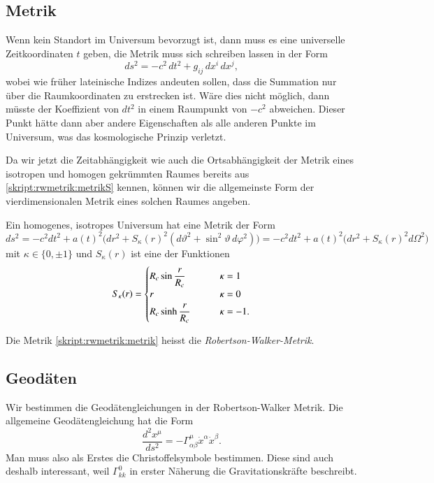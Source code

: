 
\subsection{Metrik}
Wenn kein Standort im Universum bevorzugt ist, dann muss es
eine universelle Zeitkoordinaten $t$ geben, die Metrik muss
sich schreiben lassen in der Form
\[
ds^2
=
-c^2\,dt^2
+
g_{ij}\,dx^i\,dx^j,
\]
wobei wie früher lateinische Indizes andeuten sollen, dass die
Summation nur über die Raumkoordinaten zu erstrecken ist.
Wäre dies nicht möglich, dann müsste der Koeffizient von $dt^2$
in einem Raumpunkt von $-c^2$ abweichen.
Dieser Punkt hätte dann aber andere Eigenschaften als alle anderen
Punkte im Universum, was das kosmologische Prinzip verletzt.

Da wir jetzt die Zeitabhängigkeit wie auch die Ortsabhängigkeit der
Metrik eines isotropen und homogen gekrümmten Raumes bereits aus
\eqref{skript:rwmetrik:metrikS} kennen, können
wir die allgemeinste Form der vierdimensionalen Metrik eines solchen
Raumes angeben.

\begin{satz}
Ein homogenes, isotropes Universum hat eine Metrik der Form
\begin{equation}
ds^2
=
-c^2 dt^2 + a(t)^2\bigl(
dr^2 + S_\kappa(r)^2(d\vartheta^2 + \sin^2\vartheta\, d\varphi^2)
\bigr)
=
-c^2 dt^2 + a(t)^2\bigl(
dr^2 + S_\kappa(r)^2 d\Omega^2
\bigr)
\label{skript:rwmetrik:metrik}
\end{equation}
mit $\kappa\in\{0,\pm1\}$ und 
$S_\kappa(r)$ ist eine der Funktionen
\[
S_\kappa(r)
=
\begin{cases}
R_c\sin \displaystyle\frac{\mathstrut r}{R_c}&\qquad \kappa= 1\\
r&\qquad \kappa=0\\
R_c\sinh\displaystyle\frac{\mathstrut r}{R_c}&\qquad \kappa=-1.
\end{cases}
\]
\end{satz}
Die Metrik \eqref{skript:rwmetrik:metrik} heisst die
{\em Robertson-Walker-Metrik}.

\subsection{Geodäten}
Wir bestimmen die Geodätengleichungen in der Robertson-Walker Metrik.
Die allgemeine Geodätengleichung hat die Form
\[
\frac{d^2x^\mu}{ds^2} = -\Gamma^\mu_{\alpha\beta} \dot x^\alpha \dot x^\beta.
\]
Man muss also als Erstes die Christoffelsymbole bestimmen.  
Diese sind auch deshalb interessant, weil $\Gamma^0_{kk}$ in erster
Näherung die Gravitationskräfte beschreibt.

